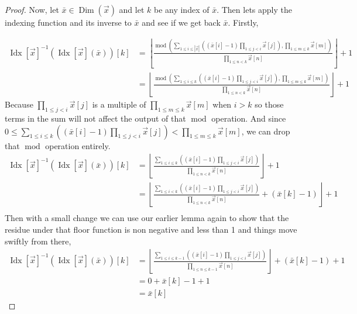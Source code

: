 \documentclass[12pt]{book}
\theoremstyle{plain}
\theoremstyle{definition}
\theoremstyle{ppart}
\theoremstyle{case}
\theoremstyle{solution}
\DeclareMathOperator{\Dim}{Dim}
\DeclareMathOperator{\remainder}{mod}
\DeclareMathOperator{\Idx}{Idx}
\newcommand{\shape}[1]{\left|#1\right|}
\begin{document}
\begin{landscape}
\begin{proof}
Now, let $\bar{x} \in \Dim(\vec{x})$ and let $k$ be any index of $\bar{x}$.
Then lets apply the indexing function and its inverse to $\bar{x}$ and see if we get
back $\bar{x}$. Firstly,

\begin{align*}
  \Idx[\vec{x}]^{-1}(\Idx[\vec{x}](\bar{x}))[k] &= 
  \left\lfloor
    \frac{\remainder\left(
      \sum_{1 \le i \le \shape{\vec{x}}} \left( (\bar{x}[i]-1) \prod_{1 \le j < i} \vec{x}[j] \right) 
      , \prod_{1 \le m \le k} \vec{x}[m]\right)}
    {\prod_{1 \le n < k} \vec{x}[n]}
  \right\rfloor + 1 \\
  &=
  \left\lfloor
    \frac{\remainder\left(
      \sum_{1 \le i \le k} \left( (\bar{x}[i]-1) \prod_{1 \le j < i} \vec{x}[j] \right) 
      , \prod_{1 \le m \le k} \vec{x}[m]\right)}
    {\prod_{1 \le n < k} \vec{x}[n]}
  \right\rfloor + 1
\end{align*}
Because $\prod_{1 \le j < i} \vec{x}[j]$ is a multiple of $\prod_{1 \le m \le k} \vec{x}[m]$
when $i > k$ so those terms in the sum will not affect the output of that $\remainder$ operation.
And since $0 \le \sum_{1 \le i \le k} \left( (\bar{x}[i]-1) \prod_{1 \le j < i} \vec{x}[j] \right) < \prod_{1 \le m \le k} \vec{x}[m]$,
we can drop that $\remainder$ operation entirely.
\begin{align*}
  \Idx[\vec{x}]^{-1}(\Idx[\vec{x}](\bar{x}))[k] &= 
  \left\lfloor
    \frac{
      \sum_{1 \le i \le k} \left( (\bar{x}[i]-1) \prod_{1 \le j < i} \vec{x}[j] \right) 
    }
    {\prod_{1 \le n < k} \vec{x}[n]}
  \right\rfloor + 1 \\
  &=
  \left\lfloor
    \frac{
      \sum_{1 \le i < k} \left( (\bar{x}[i]-1) \prod_{1 \le j < i} \vec{x}[j] \right) 
    }
    {\prod_{1 \le n < k} \vec{x}[n]}
    +
    (\bar{x}[k]-1)
  \right\rfloor + 1 \\
\end{align*}
Then with a small change we can use our earlier lemma again to show that the
residue under that floor function is non negative and less than 1 and things move swiftly from there,
\begin{align*}
  \Idx[\vec{x}]^{-1}(\Idx[\vec{x}](\bar{x}))[k] &= 
  \left\lfloor
    \frac{
      \sum_{1 \le i \le k-1} \left( (\bar{x}[i]-1) \prod_{1 \le j < i} \vec{x}[j] \right) 
    }
    {\prod_{1 \le n \le k-1} \vec{x}[n]}
  \right\rfloor
  +(\bar{x}[k]-1)+1 \\
  &= 0+\bar{x}[k]-1+1 \\
  &= \bar{x}[k]
\end{align*}


\end{proof}
\end{landscape}
\end{document}
